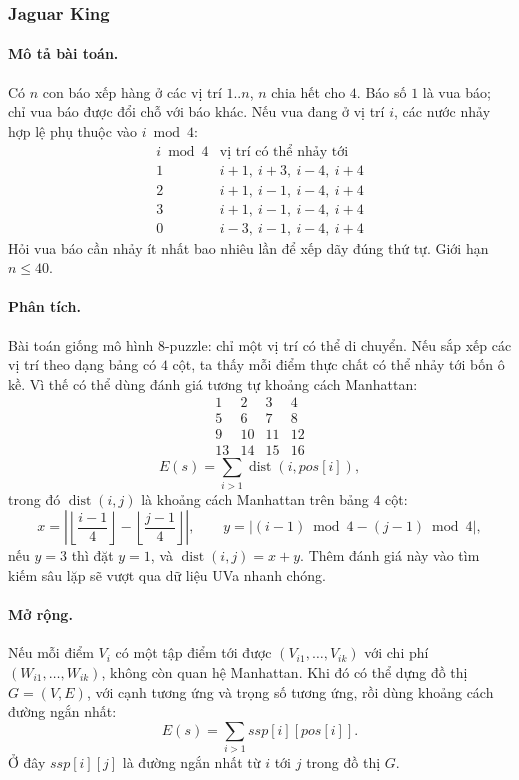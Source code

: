 \documentclass[11pt]{article}
\newcommand{\dist}{\operatorname{dist}}
\begin{document}
\subsubsection{Jaguar King}

\paragraph{Mô tả bài toán.}
Có \(n\) con báo xếp hàng ở các vị trí \(1..n\), \(n\) chia hết cho \(4\). Báo
số \(1\) là vua báo; chỉ vua báo được đổi chỗ với báo khác. Nếu vua đang ở vị
trí \(i\), các nước nhảy hợp lệ phụ thuộc vào \(i\bmod 4\):
\[
\begin{array}{c|l}
i\bmod4 & \text{vị trí có thể nhảy tới}\\
\hline
1 & i+1,\ i+3,\ i-4,\ i+4\\
2 & i+1,\ i-1,\ i-4,\ i+4\\
3 & i+1,\ i-1,\ i-4,\ i+4\\
0 & i-3,\ i-1,\ i-4,\ i+4
\end{array}
\]
Hỏi vua báo cần nhảy ít nhất bao nhiêu lần để xếp dãy đúng thứ tự. Giới hạn
\(n\le40\).

\paragraph{Phân tích.}
Bài toán giống mô hình \(8\)-puzzle: chỉ một vị trí có thể di chuyển. Nếu sắp
xếp các vị trí theo dạng bảng có \(4\) cột, ta thấy mỗi điểm thực chất có thể
nhảy tới bốn ô kề. Vì thế có thể dùng đánh giá tương tự khoảng cách Manhattan:
\[
\begin{array}{rrrr}
1&2&3&4\\
5&6&7&8\\
9&10&11&12\\
13&14&15&16
\end{array}
\]
\[
  E(s)=\sum_{i>1}\dist(i,\mathit{pos}[i]),
\]
trong đó \(\dist(i,j)\) là khoảng cách Manhattan trên bảng \(4\) cột:
\[
  x=\left|\left\lfloor\frac{i-1}{4}\right\rfloor
      -\left\lfloor\frac{j-1}{4}\right\rfloor\right|,\qquad
  y=|(i-1)\bmod4-(j-1)\bmod4|,
\]
nếu \(y=3\) thì đặt \(y=1\), và \(\dist(i,j)=x+y\). Thêm đánh giá này vào tìm
kiếm sâu lặp sẽ vượt qua dữ liệu UVa nhanh chóng.

\paragraph{Mở rộng.}
Nếu mỗi điểm \(V_i\) có một tập điểm tới được \((V_{i1},\ldots,V_{ik})\) với
chi phí \((W_{i1},\ldots,W_{ik})\), không còn quan hệ Manhattan. Khi đó có thể
dựng đồ thị \(G=(V,E)\), với cạnh tương ứng và trọng số tương ứng, rồi dùng
khoảng cách đường ngắn nhất:
\[
  E(s)=\sum_{i>1}\mathit{ssp}[i][\mathit{pos}[i]].
\]
Ở đây \(\mathit{ssp}[i][j]\) là đường ngắn nhất từ \(i\) tới \(j\) trong đồ thị
\(G\).
\end{document}

